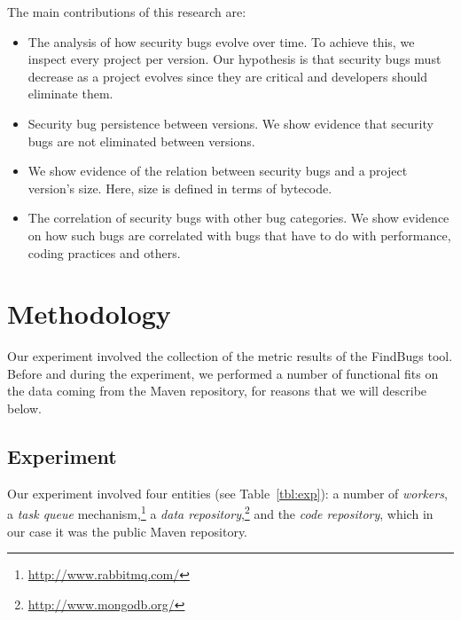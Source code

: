 \documentclass[conference]{llncs}
\begin{document}
The main contributions of this research are:
\begin{itemize}
	\item The analysis of how security bugs evolve over time. To achieve
this, we inspect every project per version. Our hypothesis is that security
bugs must decrease as a project evolves since they are critical and developers
should eliminate them.
	\item Security bug persistence between versions. We show evidence that
security bugs are not eliminated between versions.
	\item We show evidence of the relation between security bugs and a project
version's size.  Here, size is defined in terms of bytecode.
	\item The correlation of security bugs with other bug categories. We
show evidence on how such bugs are correlated with bugs that have to do with
performance, coding practices and others.
\end{itemize}


\section{Methodology}
\label{sec:meth}

Our experiment involved the collection of the metric results of the FindBugs
tool. Before and during the experiment, we performed a number of functional
fits on the data coming from the Maven repository, for reasons that we will describe below.

\subsection{Experiment}
\label{sec:exp}

Our experiment involved four entities (see Table~\ref{tbl:exp}):
a number of {\it workers}, a {\it task queue}
mechanism,\footnote{\url{http://www.rabbitmq.com/}}
a {\it data repository},\footnote{\url{http://www.mongodb.org/}}
and the {\it code repository}, which in our case it was
the public Maven repository.
\end{document}
